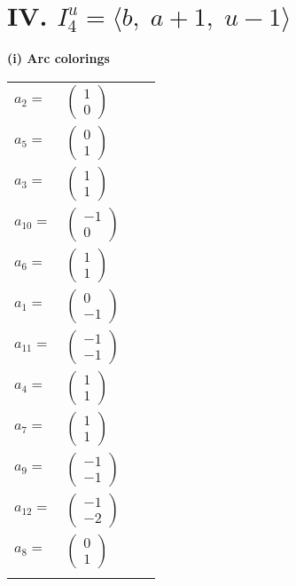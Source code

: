 \documentclass[1p]{elsarticle_modified}
\theoremstyle{definition}
\begin{document}
\centering \section*{IV. $I^u_{4}= \langle b,\;a+1,\;u-1 \rangle$}
\flushleft \textbf{(i) Arc colorings}\\
\begin{tabular}{m{7pt} m{180pt} m{7pt} m{180pt} }
\flushright $a_{2}=$&$\begin{pmatrix}1\\0\end{pmatrix}$ \\
\flushright $a_{5}=$&$\begin{pmatrix}0\\1\end{pmatrix}$ \\
\flushright $a_{3}=$&$\begin{pmatrix}1\\1\end{pmatrix}$ \\
\flushright $a_{10}=$&$\begin{pmatrix}-1\\0\end{pmatrix}$ \\
\flushright $a_{6}=$&$\begin{pmatrix}1\\1\end{pmatrix}$ \\
\flushright $a_{1}=$&$\begin{pmatrix}0\\-1\end{pmatrix}$ \\
\flushright $a_{11}=$&$\begin{pmatrix}-1\\-1\end{pmatrix}$ \\
\flushright $a_{4}=$&$\begin{pmatrix}1\\1\end{pmatrix}$ \\
\flushright $a_{7}=$&$\begin{pmatrix}1\\1\end{pmatrix}$ \\
\flushright $a_{9}=$&$\begin{pmatrix}-1\\-1\end{pmatrix}$ \\
\flushright $a_{12}=$&$\begin{pmatrix}-1\\-2\end{pmatrix}$ \\
\flushright $a_{8}=$&$\begin{pmatrix}0\\1\end{pmatrix}$\\&\end{tabular}
\end{document}

